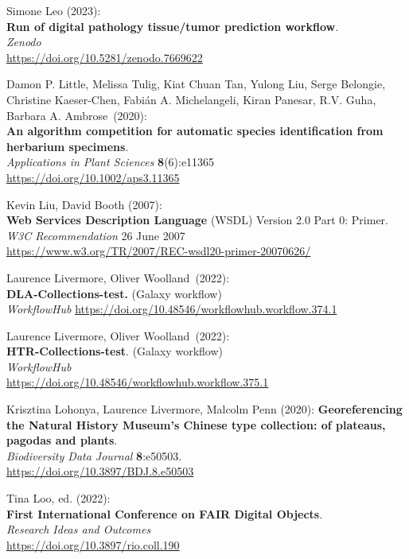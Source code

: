 \begin{thebibliography}{9}
Simone Leo (2023):\\
\textbf{Run of digital pathology tissue/tumor prediction workflow}.\\
\emph{Zenodo}\\
\url{https://doi.org/10.5281/zenodo.7669622}

Damon P. Little, Melissa Tulig, Kiat Chuan Tan, Yulong Liu, Serge Belongie, Christine Kaeser‐Chen, Fabián A. Michelangeli, Kiran Panesar, R.V. Guha, Barbara A. Ambrose~(2020):\\
\textbf{An algorithm competition for automatic species identification from herbarium specimens}.\\
\emph{Applications in Plant Sciences} \textbf{8}(6):e11365\\
\url{https://doi.org/10.1002/aps3.11365}

Kevin Liu, David Booth (2007): \\
\textbf{Web Services Description Language} (WSDL) Version 2.0
Part 0: Primer. \\
\emph{W3C Recommendation} 26 June 2007 \\
\url{https://www.w3.org/TR/2007/REC-wsdl20-primer-20070626/}

Laurence Livermore, Oliver Woolland~(2022):\\
\textbf{DLA-Collections-test.} (Galaxy workflow)\\
\emph{WorkflowHub}
\url{https://doi.org/10.48546/workflowhub.workflow.374.1}

Laurence Livermore, Oliver Woolland~(2022):\\
\textbf{HTR-Collections-test}. (Galaxy workflow)\\
\emph{WorkflowHub}\\
\url{https://doi.org/10.48546/workflowhub.workflow.375.1}

Krisztina Lohonya, Laurence Livermore, Malcolm Penn (2020):
\textbf{Georeferencing the Natural History Museum's Chinese type collection: of plateaus,
pagodas and plants}.\\
\emph{Biodiversity Data Journal} \textbf{8}:e50503.\\
\url{https://doi.org/10.3897/BDJ.8.e50503}


Tina Loo, ed. (2022): \\
\textbf{First International Conference on FAIR Digital Objects}.\\
\emph{Research Ideas and Outcomes}\\
\url{https://doi.org/10.3897/rio.coll.190}


\end{thebibliography}
